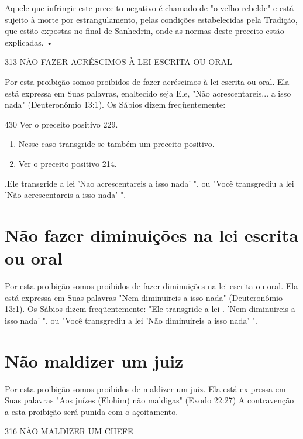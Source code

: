 \begin{itemize}
\begin{enumrate}
\begin{itemize}
\begin{itemize}
\begin{itemize}
Aquele que infringir este preceito negativo é chamado de "o velho
rebelde" e está sujeito à morte por estrangulamento, pelas condições
estabele­cidas pela Tradição, que estão expostas no final de Sanhedrin,
onde as normas deste preceito estão explicadas. •

313 NÃO FAZER ACRÉSCIMOS À LEI ESCRITA OU ORAL

Por esta proibição somos proibidos de fazer acréscimos à lei escrita ou
oral. Ela está expressa em Suas palavras, enaltecido seja Ele, "Não
acrescen­tareis... a isso nada" (Deuteronômio 13:1). Os Sábios dizem
freqüentemente:

430 Ver o preceito positivo 229.


\begin{enumerate}
\def\labelenumi{\arabic{enumi}.}
\setcounter{enumi}{430}
\item
 
 Nesse caso transgride se também um preceito positivo.
 
\item
 
 Ver o preceito positivo 214.
 
\end{enumerate}


.Ele transgride a lei 'Nao acrescentareis a isso nada'
", ou "Você transgrediu a lei 'Não acrescentareis a isso nada' ".

\section{Não fazer diminuições na lei escrita ou oral}

Por esta proibição somos proibidos de fazer diminuições na lei es­crita
ou oral. Ela está expressa em Suas palavras "Nem diminuireis a isso
nada" (Deuteronômio 13:1). Os Sábios dizem freqüentemente: "Ele
transgride a lei . 'Nem diminuireis a isso nada' ", ou "Você transgrediu
a lei 'Não diminuireis a isso nada' ".

\section{Não maldizer um juiz}

Por esta proibição somos proibidos de maldizer um juiz. Ela está ex
pressa em Suas palavras "Aos juízes (Elohim) não maldigas" (Exodo 22:27)
A contravenção a esta proibição será punida com o açoitamento.

316 NÃO MALDIZER UM CHEFE


\end{itemize}
\end{itemize}
\end{itemize}
\end{enumrate}
\end{itemize}

